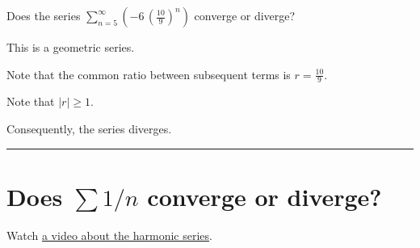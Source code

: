 \documentclass{ximera}
\begin{document}
\begin{question}
  Does the series \(\displaystyle\sum_{n=5}^\infty \left( -6 \, \left(\displaystyle\frac{10}{9}\right)^{n} \right)\) converge or diverge?

  \begin{solution}
    \begin{hint}
      This is a geometric series.
    \end{hint}
    \begin{hint}
      Note that the common ratio between subsequent terms is \(r = \displaystyle\frac{10}{9}\).
    \end{hint}
    \begin{hint}
      Note that \(|r| \geq 1\).
    \end{hint}
    \begin{hint}
      Consequently, the series diverges.
      
    \end{hint}
    

    \begin{multiple-choice}
    \end{multiple-choice}

  \end{solution}
\end{question}

\hrule
\section{Does $\sum 1/n$ converge or diverge?}

Watch \href{https://www.youtube.com/watch?v=_Ui5_-lIK34}{a video about the harmonic series}.
\end{document}
